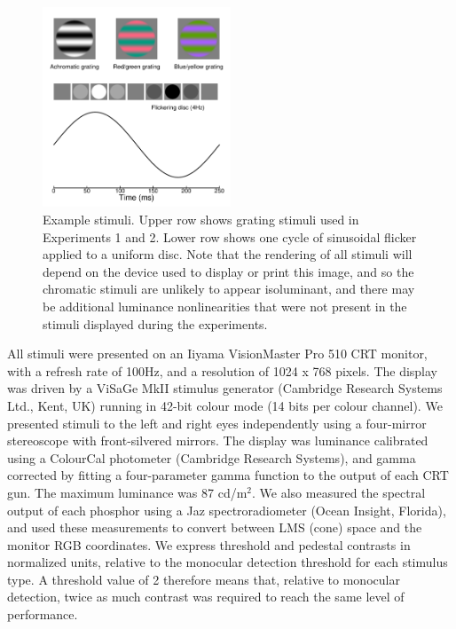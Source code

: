 \documentclass[
  letterpaper,
  DIV=11,
  numbers=noendperiod]{scrartcl}
\begin{document}
\begin{figure}

{\centering \includegraphics[width=0.5\textwidth,height=\textheight]{Figures/examplestim.pdf}

}

\caption{\label{fig-examplestim}Example stimuli. Upper row shows grating
stimuli used in Experiments 1 and 2. Lower row shows one cycle of
sinusoidal flicker applied to a uniform disc. Note that the rendering of
all stimuli will depend on the device used to display or print this
image, and so the chromatic stimuli are unlikely to appear isoluminant,
and there may be additional luminance nonlinearities that were not
present in the stimuli displayed during the experiments.}

\end{figure}

All stimuli were presented on an Iiyama VisionMaster Pro 510 CRT
monitor, with a refresh rate of 100Hz, and a resolution of 1024 x 768
pixels. The display was driven by a ViSaGe MkII stimulus generator
(Cambridge Research Systems Ltd., Kent, UK) running in 42-bit colour
mode (14 bits per colour channel). We presented stimuli to the left and
right eyes independently using a four-mirror stereoscope with
front-silvered mirrors. The display was luminance calibrated using a
ColourCal photometer (Cambridge Research Systems), and gamma corrected
by fitting a four-parameter gamma function to the output of each CRT
gun. The maximum luminance was 87 cd/m\(^2\). We also measured the
spectral output of each phosphor using a Jaz spectroradiometer (Ocean
Insight, Florida), and used these measurements to convert between LMS
(cone) space and the monitor RGB coordinates. We express threshold and
pedestal contrasts in normalized units, relative to the monocular
detection threshold for each stimulus type. A threshold value of 2
therefore means that, relative to monocular detection, twice as much
contrast was required to reach the same level of performance.
\end{document}
